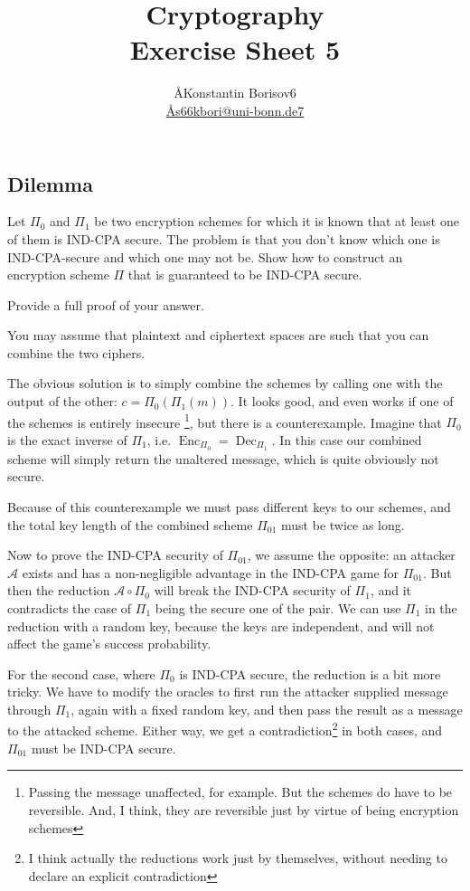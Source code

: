 \documentclass{article}
\title{Cryptography \\ Exercise Sheet 5}
\author{
  \AA{Konstantin Borisov}{6} \\
  \href{mailto:\AA{s66kbori@uni-bonn.de}{7}}{\AA{s66kbori@uni-bonn.de}{7}}
}
\begin{document}
  \maketitle

  \setcounter{section}{5}
  \subsection{Dilemma}
  \begin{centerframebox}
    Let $\Pi_0$ and $\Pi_1$ be two encryption schemes for which it is known that at
    least one of them is IND-CPA secure. The problem is that you don't know
    which one is IND-CPA-secure and which one may not be. Show how to
    construct an encryption scheme $\Pi$ that is guaranteed to be IND-CPA secure.

    Provide a full proof of your answer.

    You may assume that plaintext and ciphertext spaces are such that you can
    combine the two ciphers.
  \end{centerframebox}
  The obvious solution is to simply combine the schemes by calling one with the output of the other: $c = \Pi_0(\Pi_1(m))$.
  It looks good, and even works if one of the schemes is entirely insecure%
  \footnote{Passing the message unaffected, for example. But the schemes do have to be reversible. And, I think, they are reversible just by virtue of being encryption schemes},
  but there is a counterexample.
  Imagine that $\Pi_0$ is the exact inverse of $\Pi_1$, i.e. $\operatorname{Enc}_{\Pi_0} = \operatorname{Dec}_{\Pi_1}$.
  In this case our combined scheme will simply return the unaltered message, which is quite obviously not secure.

  Because of this counterexample we must pass different keys to our schemes,
  and the total key length of the combined scheme $\Pi_{01}$ must be twice as long.

  Now to prove the IND-CPA security of $\Pi_{01}$, we assume the opposite:
  an attacker $\mathcal{A}$ exists and has a non-negligible advantage in the IND-CPA game for $\Pi_{01}$.
  But then the reduction $\mathcal{A} \circ \Pi_0$ will break the IND-CPA security of $\Pi_1$,
  and it contradicts the case of $\Pi_1$ being the secure one of the pair.
  We can use $\Pi_1$ in the reduction with a random key, because the keys are independent,
  and will not affect the game's success probability.

  For the second case, where $\Pi_0$ is IND-CPA secure, the reduction is a bit more tricky.
  We have to modify the oracles to first run the attacker supplied message through $\Pi_1$,
  again with a fixed random key, and then pass the result as a message to the attacked scheme.
  Either way, we get a contradiction\footnote{I think actually the reductions work just by themselves, without needing to declare an explicit contradiction} in both cases, and $\Pi_{01}$ must be IND-CPA secure.
\end{document}
